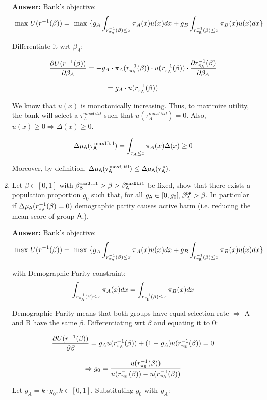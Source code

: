 \begin{enumerate}
	
	\textbf{Answer:} Bank's objective:
    $$ \text{ max } U(r^{-1}(\beta)) = \text{ max } \{g_A\int_{r^{-1}_{\pi_{\mathsf{A}}}(\beta) \leq x} \pi_A(x)u(x)dx + g_B\int_{r^{-1}_{\pi_{\mathsf{B}}}(\beta) \leq x} \pi_B(x)u(x)dx\} $$

    Differentiate it wrt $\beta_A$:

    $$ \frac{\partial U(r^{-1}(\beta))}{\partial \beta_A} = -g_A \cdot \pi_A(r^{-1}_{\pi_{\mathsf{A}}}(\beta)) \cdot u(r^{-1}_{\pi_{\mathsf{A}}}(\beta)) \cdot \frac{\partial r^{-1}_{\pi_{\mathsf{A}}}(\beta)}{\partial \beta_A} $$

    $$ =  g_A \cdot u(r^{-1}_{\pi_{\mathsf{A}}}(\beta)) $$

    We know that $u(x)$ is monotonically increasing. Thus, to maximize utility, the bank will select a $\tau^{maxUtil}_A$ such that $u(\tau^{maxUtil}_A) = 0$. Also, $u(x)\geq 0 \Rightarrow \Delta(x) \geq0$.

    $$ \Delta\mu_{\mathsf{A}}(\tau^{\text{maxUtil}}_{\mathsf{A}}) = \int_{\tau_A \leq x} \pi_A(x) \Delta(x) \geq 0$$

    Moreover, by definition, $\Delta\mu_{\mathsf{A}}(\tau^{\text{maxUtil}}_{\mathsf{A}}) \leq \Delta\mu_{\mathsf{A}}(\tau^*_{\mathsf{A}})$.
	
	\item Let $\beta \in [0,1]$ with $\beta_{\mathsf{B}}^{\texttt{maxUtil}}> \beta > \beta_{\mathsf{A}}^{\texttt{maxUtil}}$ be fixed, show that there exists a population proportion $g_0$ such that, for all $g_{\mathsf{A}} \in [0,g_0], \beta_A^{\texttt{DP}} > \beta $. In particular if $\Delta\mu_{\mathsf{A}}(r^{-1}_{\pi_{\mathsf{A}}}(\beta)=0)$ demographic parity causes active harm (i.e. reducing the mean score of group $\mathsf{A}$.).
	
	\textbf{Answer:} Bank's objective:
    $$ \text{ max } U(r^{-1}(\beta)) = \text{ max } \{g_A\int_{r^{-1}_{\pi_{\mathsf{A}}}(\beta) \leq x} \pi_A(x)u(x)dx + g_B\int_{r^{-1}_{\pi_{\mathsf{B}}}(\beta) \leq x} \pi_B(x)u(x)dx\} $$

    with Demographic Parity constraint:
    $$ \int_{r^{-1}_{\pi_{\mathsf{A}}}(\beta) \leq x} \pi_A(x)dx = \int_{r^{-1}_{\pi_{\mathsf{B}}}(\beta) \leq x} \pi_B(x)dx $$

    Demographic Parity means that both groups have equal selection rate $\Rightarrow$ A and B have the same $\beta$. Differentiating wrt $\beta$ and equating it to 0:

    $$ \frac{\partial U(r^{-1}(\beta))}{\partial \beta} = g_A u(r^{-1}_{\pi_{\mathsf{A}}}(\beta)) + (1 - g_A) u(r^{-1}_{\pi_{\mathsf{B}}}(\beta)) = 0 $$

    $$ \Rightarrow g_0 = \frac{u(r^{-1}_{\pi_{\mathsf{B}}}(\beta))}{u(r^{-1}_{\pi_{\mathsf{B}}}(\beta)) - u(r^{-1}_{\pi_{\mathsf{A}}}(\beta))} $$

    Let $g_A = k \cdot g_0, k \in [0, 1]$. Substituting $g_0$ with $g_A$:


\end{enumerate}
